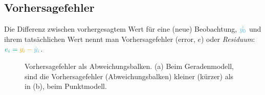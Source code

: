 \documentclass[
  letterpaper,
  twoside,
  open=any]{scrbook}
\theoremstyle{definition}
\theoremstyle{definition}
\theoremstyle{definition}
\theoremstyle{remark}
\begin{document}
\subsection{Vorhersagefehler}\label{vorhersagefehler}

Die Differenz zwischen vorhergesagtem Wert für eine (neue) Beobachtung,
\(\color{modelcol}{\hat{y_0}}\) und ihrem tatsächlichen Wert nennt man
Vorhersagefehler (error, \(e\)) oder \emph{Residuum}:
\(\color{errorcol}{e_i} = \color{ycol}{y_i} - \color{modelcol}{\hat{y}_i}\).

\begin{figure}

\begin{minipage}{0.50\linewidth}



\end{minipage}%
%
\begin{minipage}{0.50\linewidth}



\end{minipage}%

\caption{\label{fig-resid}Vorhersagefehler als Abweichungsbalken. (a)
Beim Geradenmodell, sind die Vorhersagefehler (Abweichungsbalken)
kleiner (kürzer) als in (b), beim Punktmodell.}

\end{figure}%
\end{document}
